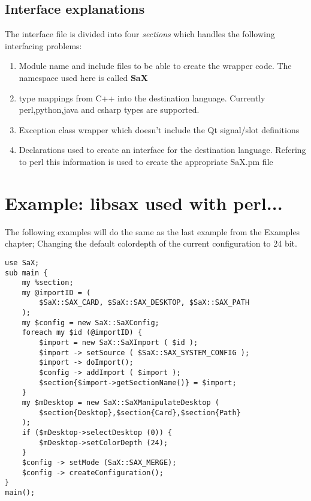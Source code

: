 \newpage

\subsection{Interface explanations}
The interface file is divided into four \textit{sections} which
handles the following interfacing problems:

\begin{enumerate}
\item Module name and include files to be able to create the
      wrapper code. The namespace used here is called \textbf{SaX}
\item type mappings from C++ into the destination language.
      Currently perl,python,java and csharp types are supported.
\item Exception class wrapper which doesn't include the Qt signal/slot
      definitions
\item Declarations used to create an interface for the destination
      language. Refering to perl this information is used to create
      the appropriate SaX.pm file
\end{enumerate}

\section{Example: libsax used with perl...}
The following examples will do the same as the last example from the
Examples chapter; Changing the default colordepth of the current
configuration to 24 bit.

\begin{Command}{12cm}
\begin{small}
\begin{verbatim}
use SaX;
sub main {
    my %section;
    my @importID = (
        $SaX::SAX_CARD, $SaX::SAX_DESKTOP, $SaX::SAX_PATH
    );
    my $config = new SaX::SaXConfig;
    foreach my $id (@importID) {
        $import = new SaX::SaXImport ( $id );
        $import -> setSource ( $SaX::SAX_SYSTEM_CONFIG );
        $import -> doImport();
        $config -> addImport ( $import );
        $section{$import->getSectionName()} = $import;
    }
    my $mDesktop = new SaX::SaXManipulateDesktop (
        $section{Desktop},$section{Card},$section{Path}
    );
    if ($mDesktop->selectDesktop (0)) {
        $mDesktop->setColorDepth (24);
    }
    $config -> setMode (SaX::SAX_MERGE);
    $config -> createConfiguration();
}
main();
\end{verbatim}
\end{small}
\end{Command}
